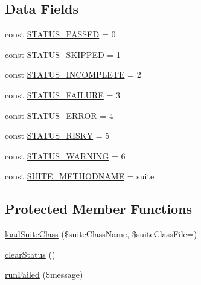\subsection*{Data Fields}
\begin{DoxyCompactItemize}
\item 
const \mbox{\hyperlink{class_p_h_p_unit___runner___base_test_runner_a1a28f0be3ad6f73b51676fccc40072ee}{S\+T\+A\+T\+U\+S\+\_\+\+P\+A\+S\+S\+ED}} = 0
\item 
const \mbox{\hyperlink{class_p_h_p_unit___runner___base_test_runner_a87afa30ee7058e12a03b79a8c6d23872}{S\+T\+A\+T\+U\+S\+\_\+\+S\+K\+I\+P\+P\+ED}} = 1
\item 
const \mbox{\hyperlink{class_p_h_p_unit___runner___base_test_runner_aa9db883bf7bde7a33417fc394104b993}{S\+T\+A\+T\+U\+S\+\_\+\+I\+N\+C\+O\+M\+P\+L\+E\+TE}} = 2
\item 
const \mbox{\hyperlink{class_p_h_p_unit___runner___base_test_runner_a28d3f8ea93c4bfa055f7d008fee14d51}{S\+T\+A\+T\+U\+S\+\_\+\+F\+A\+I\+L\+U\+RE}} = 3
\item 
const \mbox{\hyperlink{class_p_h_p_unit___runner___base_test_runner_a1146470c30c7d95d6d85427eaf81c5b3}{S\+T\+A\+T\+U\+S\+\_\+\+E\+R\+R\+OR}} = 4
\item 
const \mbox{\hyperlink{class_p_h_p_unit___runner___base_test_runner_a0bc4e56160de7672f5de9c20f39f78eb}{S\+T\+A\+T\+U\+S\+\_\+\+R\+I\+S\+KY}} = 5
\item 
const \mbox{\hyperlink{class_p_h_p_unit___runner___base_test_runner_a74244d8aee9ce6294218f69ae7b32a67}{S\+T\+A\+T\+U\+S\+\_\+\+W\+A\+R\+N\+I\+NG}} = 6
\item 
const \mbox{\hyperlink{class_p_h_p_unit___runner___base_test_runner_ac14c4ab6649e297d40a71879c09ba32e}{S\+U\+I\+T\+E\+\_\+\+M\+E\+T\+H\+O\+D\+N\+A\+ME}} = \textquotesingle{}suite\textquotesingle{}
\end{DoxyCompactItemize}
\subsection*{Protected Member Functions}
\begin{DoxyCompactItemize}
\item 
\mbox{\hyperlink{class_p_h_p_unit___runner___base_test_runner_af11a3ecd8a30be7d8d1901e343459f47}{load\+Suite\+Class}} (\$suite\+Class\+Name, \$suite\+Class\+File=\textquotesingle{}\textquotesingle{})
\item 
\mbox{\hyperlink{class_p_h_p_unit___runner___base_test_runner_a12113684dc8266d3a43668f1266ff890}{clear\+Status}} ()
\item 
\mbox{\hyperlink{class_p_h_p_unit___runner___base_test_runner_a51ed3bece021dbcaad0aa7a8c911de39}{run\+Failed}} (\$message)
\end{DoxyCompactItemize}


